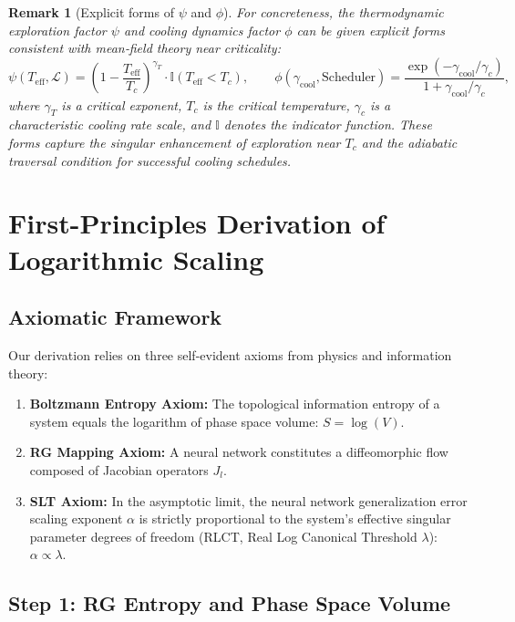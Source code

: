 \documentclass[11pt, a4paper]{article}
\theoremstyle{plain}
\newtheorem*{remark}{Remark}
\begin{document}
\begin{remark}[Explicit forms of $\psi$ and $\phi$]
For concreteness, the thermodynamic exploration factor $\psi$ and cooling dynamics factor $\phi$ can be given explicit forms consistent with mean‑field theory near criticality:
\begin{equation}
\psi(T_{\text{eff}}, \mathcal{L}) = \left( 1 - \frac{T_{\text{eff}}}{T_c} \right)^{\gamma_T} \cdot \mathbb{I}(T_{\text{eff}} < T_c),
\qquad
\phi(\gamma_{\text{cool}}, \text{Scheduler}) = \frac{\exp(-\gamma_{\text{cool}}/\gamma_c)}{1 + \gamma_{\text{cool}}/\gamma_c},
\end{equation}
where $\gamma_T$ is a critical exponent, $T_c$ is the critical temperature, $\gamma_c$ is a characteristic cooling rate scale, and $\mathbb{I}$ denotes the indicator function. These forms capture the singular enhancement of exploration near $T_c$ and the adiabatic traversal condition for successful cooling schedules.
\end{remark}


\section{First-Principles Derivation of Logarithmic Scaling}\label{sec:first_principles}

\subsection{Axiomatic Framework}

Our derivation relies on three self-evident axioms from physics and information theory:

\begin{enumerate}
    \item \textbf{Boltzmann Entropy Axiom:} The topological information entropy of a system equals the logarithm of phase space volume: $S = \log(V)$.
    \item \textbf{RG Mapping Axiom:} A neural network constitutes a diffeomorphic flow composed of Jacobian operators $J_l$.
    \item \textbf{SLT Axiom:} In the asymptotic limit, the neural network generalization error scaling exponent $\alpha$ is strictly proportional to the system's effective singular parameter degrees of freedom (RLCT, Real Log Canonical Threshold $\lambda$): $\alpha \propto \lambda$.
\end{enumerate}

\subsection{Step 1: RG Entropy and Phase Space Volume}
\end{document}
